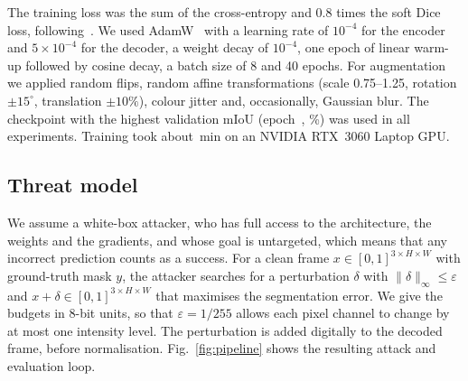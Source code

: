 \documentclass[conference]{IEEEtran}
\newcommand{\eps}{\varepsilon}
\begin{document}
The training loss was the sum of the cross-entropy and 0.8 times the soft Dice loss, following~\cite{ghamsarian2024cataract}. We used AdamW~\cite{loshchilov2019decoupled} with a learning rate of $10^{-4}$ for the encoder and $5\times10^{-4}$ for the decoder, a weight decay of $10^{-4}$, one epoch of linear warm-up followed by cosine decay, a batch size of 8 and 40 epochs. For augmentation we applied random flips, random affine transformations (scale 0.75--1.25, rotation $\pm15^\circ$, translation $\pm10\%$), colour jitter and, occasionally, Gaussian blur. The checkpoint with the highest validation mIoU (epoch~\nBestEpoch, \nValBest\%) was used in all experiments. Training took about \nTrainMin\,min on an NVIDIA RTX~3060 Laptop GPU.

\subsection{Threat model}
We assume a white-box attacker, who has full access to the architecture, the weights and the gradients, and whose goal is untargeted, which means that any incorrect prediction counts as a success. For a clean frame $x\in[0,1]^{3\times H\times W}$ with ground-truth mask $y$, the attacker searches for a perturbation $\delta$ with $\|\delta\|_\infty\le\eps$ and $x+\delta\in[0,1]^{3\times H\times W}$ that maximises the segmentation error. We give the budgets in 8-bit units, so that $\eps=1/255$ allows each pixel channel to change by at most one intensity level. The perturbation is added digitally to the decoded frame, before normalisation. Fig.~\ref{fig:pipeline} shows the resulting attack and evaluation loop.
\end{document}
